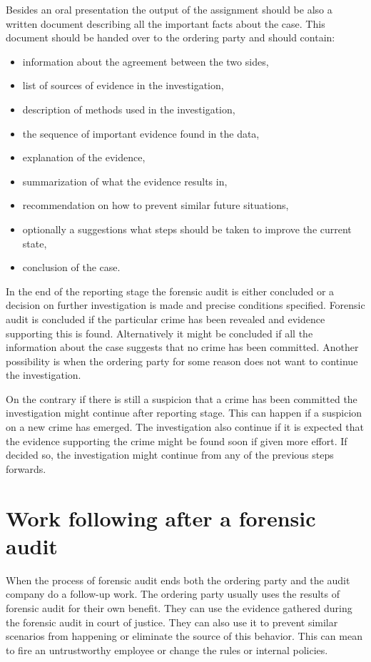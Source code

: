 Besides an oral presentation the output of the assignment should be also a written document describing all the important facts about the case. This document should be handed over to the ordering party and should contain:
\begin{itemize}
\item information about the agreement between the two sides,
\item list of sources of evidence in the investigation,
\item description of methods used in the investigation,
\item the sequence of important evidence found in the data,
\item explanation of the evidence,
\item summarization of what the evidence results in,
\item recommendation on how to prevent similar future situations,
\item optionally a suggestions what steps should be taken to improve the current state,
\item conclusion of the case.
\end {itemize}


In the end of the reporting stage the forensic audit is either concluded or a decision on further investigation is made and precise conditions specified. Forensic audit is concluded if the particular crime has been revealed and evidence supporting this is found. Alternatively it might be concluded if all the information about the case suggests that no crime has been committed. Another possibility is when the ordering party for some reason does not want to continue the investigation. 

On the contrary if there is still a suspicion that a crime has been committed the investigation might continue after reporting stage. This can happen if a suspicion on a new crime has emerged. The investigation also continue if it is expected that the evidence supporting the crime might be found soon if given more effort. If decided so, the investigation might continue from any of the previous steps forwards. 

\section{Work following after a forensic audit}

When the process of forensic audit ends both the ordering party and the audit company do a follow-up work. The ordering party usually uses the results of forensic audit for their own benefit. They can use the evidence gathered during the forensic audit in court of justice. They can also use it to prevent similar scenarios from happening or eliminate the source of this behavior. This can mean to fire an untrustworthy employee or change the rules or internal policies. 

